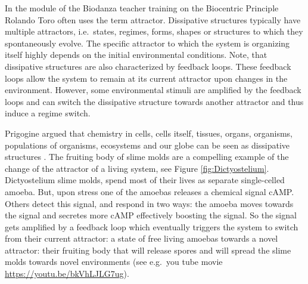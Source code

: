 \documentclass[
  11pt,
]{book}
\begin{document}
In the module of the Biodanza teacher training on the Biocentric Principle Rolando Toro often uses the term attractor. Dissipative structures typically have multiple attractors, i.e.~states, regimes, forms, shapes or structures to which they spontaneously evolve. The specific attractor to which the system is organizing itself highly depends on the initial environmental conditions.
Note, that dissipative structures are also characterized by feedback loops.
These feedback loops allow the system to remain at its current attractor upon changes in the environment.
However, some environmental stimuli are amplified by the feedback loops and can switch the dissipative structure towards another attractor and thus induce a regime switch.

Prigogine argued that chemistry in cells, cells itself, tissues, organs, organisms, populations of organisms, ecosystems and our globe can be seen as dissipative structures \citep{prigogineStengers1984}.
The fruiting body of slime molds are a compelling example of the change of the attractor of a living system, see Figure \ref{fig:Dictyostelium}. Dictyostelium slime molds, spend most of their lives as separate single-celled amoeba. But, upon stress one of the amoebas releases a chemical signal cAMP. Others detect this signal, and respond in two ways: the amoeba moves towards the signal and secretes more cAMP effectively boosting the signal. So the signal gets amplified by a feedback loop which eventually triggers the system to switch from their current attractor: a state of free living amoebas towards a novel attractor: their fruiting body that will release spores and will spread the slime molds towards novel environments (see e.g.~you tube movie \url{https://youtu.be/bkVhLJLG7ug}).
\end{document}
